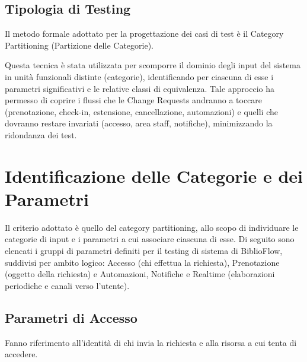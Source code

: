 \documentclass[11pt,a4paper,oneside,openany]{book}
\begin{document}
\section{Tipologia di Testing}

Il metodo formale adottato per la progettazione dei casi di test è il
Category Partitioning (Partizione delle Categorie).

Questa tecnica è stata utilizzata per scomporre il dominio degli input del
sistema in unità funzionali distinte (categorie), identificando per ciascuna
di esse i parametri significativi e le relative classi di equivalenza. Tale
approccio ha permesso di coprire i flussi che le Change Requests andranno a
toccare (prenotazione, check-in, estensione, cancellazione, automazioni) e
quelli che dovranno restare invariati (accesso, area staff, notifiche),
minimizzando la ridondanza dei test.

\chapter{Identificazione delle Categorie e dei Parametri}

Il criterio adottato è quello del category partitioning, allo scopo di
individuare le categorie di input e i parametri a cui associare ciascuna di
esse. Di seguito sono elencati i gruppi di parametri definiti per il testing
di sistema di BiblioFlow, suddivisi per ambito logico: Accesso (chi effettua
la richiesta), Prenotazione (oggetto della richiesta) e Automazioni, Notifiche
e Realtime (elaborazioni periodiche e canali verso l'utente).

\section{Parametri di Accesso}

Fanno riferimento all'identità di chi invia la richiesta e alla risorsa a cui
tenta di accedere.
\end{document}

